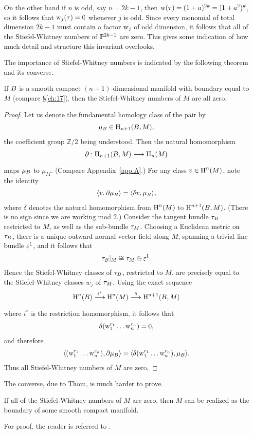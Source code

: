 \documentclass[../main]{subfiles}
\begin{document}
On the other hand if $n$ is odd, say $n=2k-1$, then $\operatorname{w}(\tau)=(1+a)^{2k}=(1+a^{2})^{k}$, so it follows that $\operatorname{w}_{j}(\tau)=0$ whenever $j$ is odd. Since every monomial of total dimension $2k-1$ must contain a factor $\operatorname{w}_{j}$ of odd dimension, it follows that all of the Stiefel-Whitney numbers of $\mathbb{P}^{2k-1}$ are zero. This gives some indication of how much detail and structure this invariant overlooks.

The importance of Stiefel-Whitney numbers is indicated by the following theorem and its converse.
\begin{theorem}[Pontrjagin]
\label{thm:04.09}
If $B$ is a smooth compact $(n+1)$-dimensional manifold with boundary equal to $M$ (compare \S\ref{ch:17}), then the Stiefel-Whitney numbers of $M$ are all zero.
\end{theorem}

\begin{proof}
Let us denote the fundamental homology class of the pair by
\[
\mu_{B}\in\operatorname{H}_{n+1}(B,M),
\]
the coefficient group $\mathbb{Z}/2$ being understood. Then the natural homomorphism
\[
 \partial:\homology_{n+1}(\B, M)\varrightarrow{} {\homology_{n}(M)}
\]
maps $\mu_{B}$ to $ \mu_M $. (Compare Appendix~\ref{app:A}.) For any class $v\in \operatorname{H}^{n}(M)$, note the identity
\[
\langle v,\partial\mu_{B} \rangle=\langle\delta v,\mu_{B}\rangle,
\]
where $\delta$ denotes the natural homomorphism from $\operatorname{H}^{n}(M)$ to $\operatorname{H}^{n+1}(B ,M)$. (There is no sign since we are working mod $2$.) Consider the tangent	bundle $\tau_{B}$ restricted to $M$, as well as the sub-bundle $\tau_{M}$. Choosing a	Euclidean metric on $\tau_{B}$, there is a unique outward normal vector field along $M$, spanning a trivial line bundle $\varepsilon^1$, and it follows that
\[
\tau_{B} |_M\cong\tau_{M}\oplus\varepsilon^1.
\]
Hence the Stiefel-Whitney classes of $\tau_{B} $, restricted to $M$, are precisely equal to the Stiefel-Whitney classes $w_j$ of $\tau_{M}$. Using the exact sequence
\[
\homology^n(\B )\varrightarrow{i^\ast}\homology^n(M)\varrightarrow{\delta} \homology^{n+1}(\B,M)
\]
where $i^\ast $ is the restriction homomorphism, it follows that
\[
\delta({\operatorname{w}}_{1}^{r_{1}} \dots \operatorname{w}_{n}^{r_n})=0,
\]
and therefore
\[
\langle({\operatorname{w}}_{1}^{r_{1}} \dots \operatorname{w}_{n}^{r_n}),\partial\mu_{B} \rangle=\langle\delta({\operatorname{w}}_{1}^{r_{1}} \dots \operatorname{w}_{n}^{r_n}),\mu_{B} \rangle.
\]
Thus all Stiefel-Whitney numbers of $M$ are zero.
\end{proof}
The converse, due to Thom, is much harder to prove. 
\begin{theorem}[Thom]
\label{thm:04.10}
If all of the Stiefel-Whitney numbers
of $M$ are zero, then $M$ can be realized as the boundary of some smooth compact manifold.
\end{theorem}
For proof, the reader is referred to \cite{stongcobordism1968}.
\end{document}
